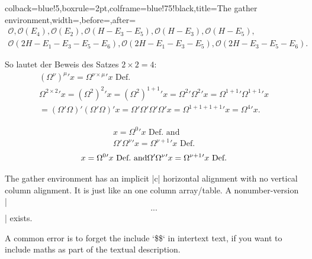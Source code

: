 {\begin{tcblisting}{colback=blue!5,boxrule=2pt,colframe=blue!75!black,title=The gather environment,width=\textwidth,before=\bigskip,after=\bigskip}
\def\O{\mathcal{O}}
\begin{gather}
 \O,\O(E_4),\O(E_2),\O(H-E_3-E_5),\O(H-E_3),\O(H-E_5),\\ 
\O(2H-E_1-E_3-E_5-E_6),\O(2H-E_1-E_3-E_5),\O(2H-E_3-E_5-E_6).
\end{gather}

So lautet der Beweis des Satzes $2 \times 2 = 4$:
\begin{gather}
(\Omega^{\nu})^{\mu}{}'x = \Omega^{\nu \times \mu}{}'x \text{ Def.}\\
\Omega^{2 \times 2}{}'x = (\Omega^{2})^{2}{}'x = (\Omega^{2})^{1 + 1}{}'x = \Omega^{2}{}'\Omega^{2}{}'x = \Omega^{1 + 1}{}'\Omega^{1 + 1}{}'x\nonumber \\
= (\Omega'\Omega)'(\Omega'\Omega)'x = \Omega'\Omega'\Omega'\Omega'x = \Omega^{1 + 1 + 1 + 1}{}'x = \Omega^{4}{}'x.
\end{gather}


\begin{gather*}
x = \Omega^{0}{}' x \text{ Def.\ and}\\
\Omega'\Omega^{\nu}{}'x = \Omega^{\nu+1}{}'x \text{ Def.}
\end{gather*}
\begin{equation}
x = \Omega^{0}{}' x \text{ Def.\ and}\\
\Omega'\Omega^{\nu}{}'x = \Omega^{\nu+1}{}'x \text{ Def.}
\end{equation}
\end{tcblisting}


The gather environment has an implicit |{c}| horizontal alignment with no
vertical column alignment. It is just like an one column array/table.
A nonumber-version |\begin{gather*}...\end{gather*}| exists. 

A common error is to forget the include `\$\$` in intertext text, if you want to include
maths as part of the textual description.

}
